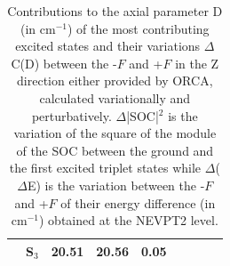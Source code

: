 \documentclass[12pt,a4paper]{report}
\numberwithin{equation}{section}
\begin{document}
\begin{table}[h]
{\begin{tabular}{c | c | c  c | c c c |c |c}
     & S$_3$ &  20.51 &  20.56 &  0.05 &        &    &     &       \\
    \hline
    \end{tabular}
    }
    \caption[Contributions to the axial parameter D of the most contributing excited states, variations of SOC and energy difference $\Delta E$ for $\vec{\vb{F}}\parallel Z$]{Contributions to the axial parameter D (in cm$^{-1}$) of the most contributing excited states and their variations $\Delta$C(D) between the -$F$ and +$F$ in the Z direction either provided by ORCA, calculated variationally and perturbatively. $\Delta$|SOC|$^2$ is the variation of the square of the module of the SOC between the ground and the first excited triplet states while $\Delta$($\Delta$E) is the variation between the -$F$ and +$F$ of their energy difference (in cm$^{-1}$) obtained at the NEVPT2 level.}
    \label{tab:Contribution_Z}
\end{table}
\end{document}
